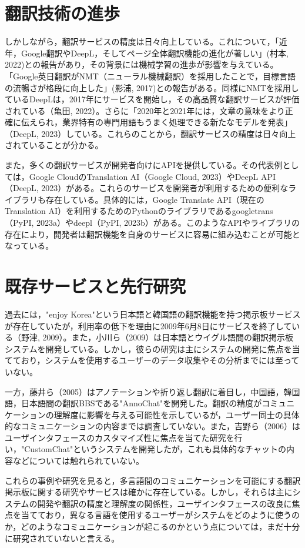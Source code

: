 \documentclass[b5paper,12pt]{jsreport}
\begin{document}
\section{翻訳技術の進歩}

しかしながら，翻訳サービスの精度は日々向上している。これについて，「近年，Google翻訳やDeepL，そしてページ全体翻訳機能の進化が著しい」(村本, 2022)との報告があり，その背景には機械学習の進歩が影響を与えている。「Google英日翻訳がNMT（ニューラル機械翻訳）を採用したことで，目標言語の流暢さが格段に向上した」(影浦, 2017)との報告がある。同様にNMTを採用しているDeepLは，2017年にサービスを開始し，その高品質な翻訳サービスが評価されている（亀田, 2022）。さらに「2020年と2021年には，文章の意味をより正確に伝えられ，業界特有の専門用語もうまく処理できる新たなモデルを発表」（DeepL, 2023）している。これらのことから，翻訳サービスの精度は日々向上されていることが分かる。

また，多くの翻訳サービスが開発者向けにAPIを提供している。その代表例としては，Google CloudのTranslation AI（Google Cloud, 2023）やDeepL API（DeepL, 2023）がある。これらのサービスを開発者が利用するための便利なライブラリも存在している。具体的には，Google Translate API（現在のTranslation AI）を利用するためのPythonのライブラリであるgoogletrans（PyPI, 2023a）やdeepl（PyPI, 2023b）がある。このようなAPIやライブラリの存在により，開発者は翻訳機能を自身のサービスに容易に組み込むことが可能となっている。

\section{既存サービスと先行研究}

過去には，"enjoy Korea"という日本語と韓国語の翻訳機能を持つ掲示板サービスが存在していたが，利用率の低下を理由に2009年6月8日にサービスを終了している（野津, 2009）。また，小川ら（2009）は日本語とウイグル語間の翻訳掲示板システムを開発している。しかし，彼らの研究は主にシステムの開発に焦点を当てており，システムを使用するユーザーのデータ収集やその分析までには至っていない。

一方，藤井ら（2005）はアノテーションや折り返し翻訳に着目し，中国語，韓国語，日本語間の翻訳BBSである"AnnoChat"を開発した。翻訳の精度がコミュニケーションの理解度に影響を与える可能性を示しているが，ユーザー同士の具体的なコミュニケーションの内容までは調査していない。また，吉野ら（2006）はユーザインタフェースのカスタマイズ性に焦点を当てた研究を行い，"CustomChat"というシステムを開発したが，これも具体的なチャットの内容などについては触れられていない。

これらの事例や研究を見ると，多言語間のコミュニケーションを可能にする翻訳掲示板に関する研究やサービスは確かに存在している。しかし，それらは主にシステムの開発や翻訳の精度と理解度の関係性，ユーザインタフェースの改良に焦点を当てており，異なる言語を使用するユーザーがシステムをどのように使うのか，どのようなコミュニケーションが起こるのかという点については，まだ十分に研究されていないと言える。
\end{document}
